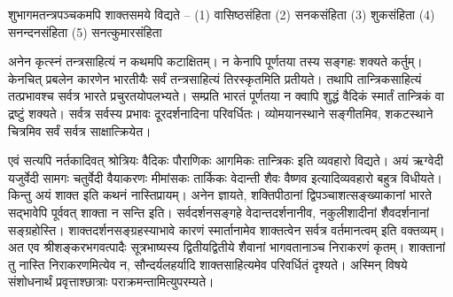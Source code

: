 शुभागमतन्त्रपञ्चकमपि शाक्तसमये विद्यते – (1) वासिष्ठसंहिता (2) सनकसंहिता (3) शुकसंहिता (4) सनन्दनसंहिता (5) सनत्कुमारसंहिता

अनेन कृत्स्नं तन्त्रसाहित्यं न कथमपि कटाक्षितम्। न केनापि पूर्णतया तस्य सङ्गहः शक्यते कर्तुम्। केनचित् प्रबलेन कारणेन भारतीयैः सर्वं तन्त्रसाहित्यं तिरस्कृतमिति प्रतीयते। तथापि तान्त्रिकसाहित्यं तत्प्रभावश्च सर्वत्र भारते प्रचुरतयोपलभ्यते। सम्प्रति भारतं पूर्णतया न क्वापि शुद्धं वैदिकं स्मार्तं तान्त्रिकं वा द्रष्टुं शक्यते। सर्वत्र सर्वस्य प्रभावः दूरदर्शनादिना परिवर्धितः। व्योमयानस्थाने सङ्गीतमिव, शकटस्थाने चित्रमिव सर्वं सर्वत्र साक्षात्क्रियेत।

एवं सत्यपि नर्तकादिवत् श्रोत्रियः वैदिकः पौराणिकः आगमिकः तान्त्रिकः इति व्यवहारो विद्यते। अयं ऋग्वेदी यजुर्वेदी सामगः चतुर्वेदी वैयाकरणः मीमांसकः तार्किकः वेदान्ती शैवः वैष्णव इत्यादिव्यवहारो बहुत्र विधीयते। किन्तु अयं शाक्त इति कथनं नास्तिप्रायम्। अनेन ज्ञायते, शक्तिपीठानां द्विपञ्चाशत्सङ्ख्याकानां भारते सद्भावेपि पूर्ववत् शाक्ता न सन्ति इति। सर्वदर्शनसङ्गहे वेदान्तदर्शनानीव, नकुलीशादीनां शैवदर्शनानां सङ्ग्रहोस्ति। शाक्तदर्शनसङ्ग्रहस्याभावे कारणं स्मार्तानामेव शाक्तत्वेन सर्वत्र वर्तमानत्वम् इति वक्तव्यम्। अत एव श्रीशङ्करभगवत्पादैः सूत्रभाष्यस्य द्वितीयद्वितीये शैवानां भागवतानाञ्च निराकरणं कृतम्। शाक्तानां तु नास्ति निराकरणमित्येव न, सौन्दर्यलहर्यादि शाक्तसाहित्यमेव परिवर्धितं दृश्यते। अस्मिन् विषये  संशोधनार्थं प्रवृत्ताश्छात्राः पराक्रमन्तामित्युपरम्यते।
